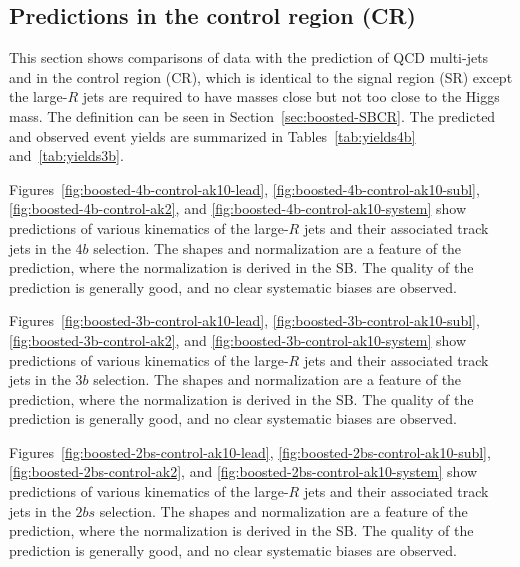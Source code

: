 \clearpage


\subsection{Predictions in the control region (CR)}
\label{sec:boosted-cr}

This section shows comparisons of data with the prediction of QCD multi-jets and \ttbar in the control region (CR), which is identical to the signal region (SR) except the large-$R$ jets are required to have masses close but not too close to the Higgs mass. The definition can be seen in Section~\ref{sec:boosted-SBCR}. The predicted and observed event yields are summarized in Tables~\ref{tab:yields4b} and~\ref{tab:yields3b}.

Figures~\ref{fig:boosted-4b-control-ak10-lead}, \ref{fig:boosted-4b-control-ak10-subl}, \ref{fig:boosted-4b-control-ak2}, and \ref{fig:boosted-4b-control-ak10-system} show predictions of various kinematics of the large-$R$ jets and their associated track jets in the $4b$ selection. The shapes and normalization are a feature of the prediction, where the normalization is derived in the SB. The quality of the prediction is generally good, and no clear systematic biases are observed.

Figures~\ref{fig:boosted-3b-control-ak10-lead}, \ref{fig:boosted-3b-control-ak10-subl}, \ref{fig:boosted-3b-control-ak2},  and \ref{fig:boosted-3b-control-ak10-system} show predictions of various kinematics of the large-$R$ jets and their associated track jets in the $3b$ selection. The shapes and normalization are a feature of the prediction, where the normalization is derived in the SB. The quality of the prediction is generally good, and no clear systematic biases are observed.

Figures~\ref{fig:boosted-2bs-control-ak10-lead}, \ref{fig:boosted-2bs-control-ak10-subl}, \ref{fig:boosted-2bs-control-ak2},  and \ref{fig:boosted-2bs-control-ak10-system} show predictions of various kinematics of the large-$R$ jets and their associated track jets in the $2bs$ selection. The shapes and normalization are a feature of the prediction, where the normalization is derived in the SB. The quality of the prediction is generally good, and no clear systematic biases are observed.

